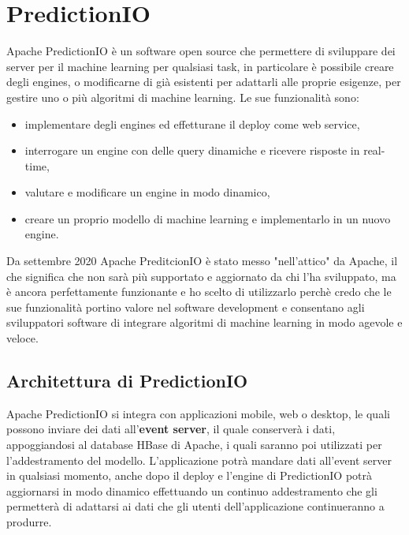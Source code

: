 \chapter{PredictionIO}\label{c:predictionio}

Apache PredictionIO è un software open source che permettere di sviluppare dei server per il machine learning per qualsiasi task, in particolare è possibile creare degli engines, o modificarne di già esistenti per adattarli alle proprie esigenze, per gestire uno o più algoritmi di machine learning. Le sue funzionalità sono:
\begin{itemize}
\item implementare degli engines ed effetturane il deploy come web service,
\item interrogare un engine con delle query dinamiche e ricevere risposte in real-time,
\item valutare e modificare un engine in modo dinamico,
\item creare un proprio modello di machine learning e implementarlo in un nuovo engine.
\end{itemize}
Da settembre 2020 Apache PreditcionIO è stato messo "nell'attico" da Apache, il che significa che non sarà più supportato e aggiornato da chi l'ha sviluppato, ma è ancora perfettamente funzionante e ho scelto di utilizzarlo perchè credo che le sue funzionalità portino valore nel software development e consentano agli sviluppatori software di integrare algoritmi di machine learning in modo agevole e veloce.

\section{Architettura di PredictionIO}
Apache PredictionIO si integra con applicazioni mobile, web o desktop, le quali possono inviare dei dati all'\textbf{event server}, il quale conserverà i dati, appoggiandosi al database HBase di Apache, i quali saranno poi utilizzati per l'addestramento del modello. L'applicazione potrà mandare dati all'event server in qualsiasi momento, anche dopo il deploy e l'engine di PredictionIO potrà aggiornarsi in modo dinamico effettuando un continuo addestramento che gli permetterà di adattarsi ai dati che gli utenti dell'applicazione continueranno a produrre.

